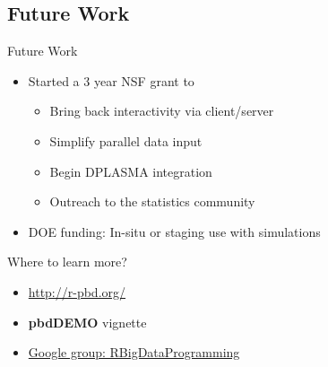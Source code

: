 


\subsection{Future Work}
\makesubcontentsslidessec

\begin{frame}
  \begin{block}{Future Work}
  \begin{itemize}
    \item Started a 3 year NSF grant to
      \begin{itemize}
      \item Bring back interactivity via client/server
      \item Simplify parallel data input
      \item Begin DPLASMA integration
      \item Outreach to the statistics community
      \end{itemize}
    \item DOE funding: In-situ or staging use with simulations
  \end{itemize}
  \end{block}
\end{frame}

\begin{frame}
  \begin{block}{Where to learn more?}
  \begin{itemize}
    \item \url{http://r-pbd.org/}
    \item \textbf{pbdDEMO} vignette
    \item \url{Google group: RBigDataProgramming}
  \end{itemize}
  \end{block}
\end{frame}

